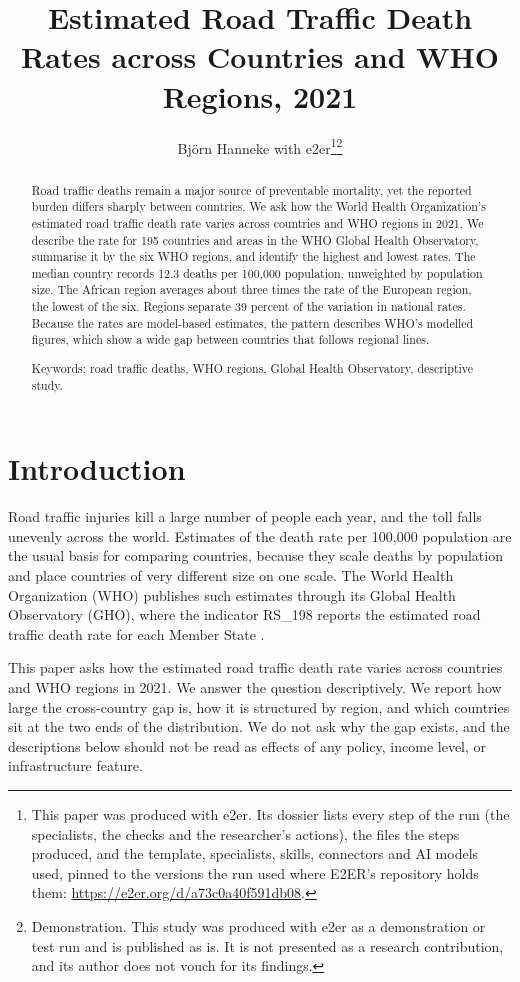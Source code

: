 \documentclass[12pt]{article}
\title{Estimated Road Traffic Death Rates across Countries and WHO Regions, 2021}
\author{Björn Hanneke with e2er\thanks{This paper was produced with e2er. Its dossier lists every step of the run (the specialists, the checks and the researcher's actions), the files the steps produced, and the template, specialists, skills, connectors and AI models used, pinned to the versions the run used where E2ER's repository holds them: \url{https://e2er.org/d/a73c0a40f591db08}.}\thanks{Demonstration. This study was produced with e2er as a demonstration or test run and is published as is. It is not presented as a research contribution, and its author does not vouch for its findings.}}
\date{}
\begin{document}
\maketitle

\begin{abstract}
Road traffic deaths remain a major source of preventable mortality, yet the reported burden differs sharply between countries. We ask how the World Health Organization's estimated road traffic death rate varies across countries and WHO regions in 2021. We describe the rate for 195 countries and areas in the WHO Global Health Observatory, summarise it by the six WHO regions, and identify the highest and lowest rates. The median country records 12.3 deaths per 100,000 population, unweighted by population size.
The African region averages about three times the rate of the European region, the lowest of the six. Regions separate 39 percent of the variation in national rates.
Because the rates are model-based estimates, the pattern describes WHO's modelled figures, which show a wide gap between countries that follows regional lines.

\medskip
\noindent Keywords: road traffic deaths, WHO regions, Global Health Observatory, descriptive study.
\end{abstract}

\section{Introduction}

Road traffic injuries kill a large number of people each year, and the toll falls unevenly across the world. Estimates of the death rate per 100,000 population are the usual basis for comparing countries, because they scale deaths by population and place countries of very different size on one scale. The World Health Organization (WHO) publishes such estimates through its Global Health Observatory (GHO), where the indicator RS\_198 reports the estimated road traffic death rate for each Member State \citep{WHO_GHO}.

This paper asks how the estimated road traffic death rate varies across countries and WHO regions in 2021. We answer the question descriptively. We report how large the cross-country gap is, how it is structured by region, and which countries sit at the two ends of the distribution. We do not ask why the gap exists, and the descriptions below should not be read as effects of any policy, income level, or infrastructure feature.
\end{document}
